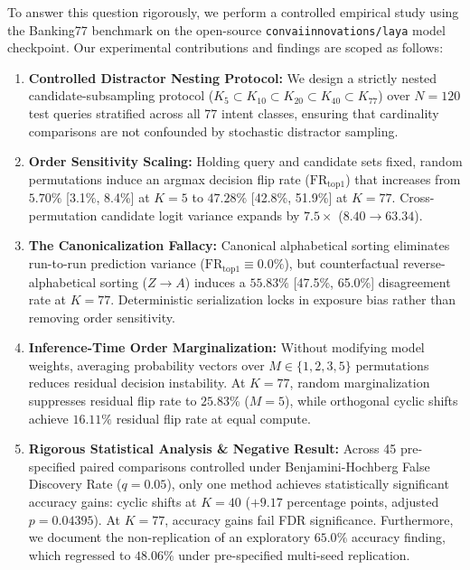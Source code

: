 \documentclass[11pt,a4paper]{article}
\begin{document}
To answer this question rigorously, we perform a controlled empirical study using the Banking77 benchmark \citep{casanueva2020efficient} on the open-source \texttt{convaiinnovations/laya} model checkpoint. Our experimental contributions and findings are scoped as follows:
\begin{enumerate}
    \item \textbf{Controlled Distractor Nesting Protocol:} We design a strictly nested candidate-subsampling protocol ($K_5 \subset K_{10} \subset K_{20} \subset K_{40} \subset K_{77}$) over $N=120$ test queries stratified across all 77 intent classes, ensuring that cardinality comparisons are not confounded by stochastic distractor sampling.
    \item \textbf{Order Sensitivity Scaling:} Holding query and candidate sets fixed, random permutations induce an argmax decision flip rate ($\mathrm{FR}_{\mathrm{top1}}$) that increases from $5.70\%$ [3.1\%, 8.4\%] at $K=5$ to $47.28\%$ [42.8\%, 51.9\%] at $K=77$. Cross-permutation candidate logit variance expands by $7.5\times$ ($8.40 \to 63.34$).
    \item \textbf{The Canonicalization Fallacy:} Canonical alphabetical sorting eliminates run-to-run prediction variance ($\mathrm{FR}_{\mathrm{top1}} \equiv 0.0\%$), but counterfactual reverse-alphabetical sorting ($Z \to A$) induces a $55.83\%$ [47.5\%, 65.0\%] disagreement rate at $K=77$. Deterministic serialization locks in exposure bias rather than removing order sensitivity.
    \item \textbf{Inference-Time Order Marginalization:} Without modifying model weights, averaging probability vectors over $M \in \{1, 2, 3, 5\}$ permutations reduces residual decision instability. At $K=77$, random marginalization suppresses residual flip rate to $25.83\%$ ($M=5$), while orthogonal cyclic shifts achieve $16.11\%$ residual flip rate at equal compute.
    \item \textbf{Rigorous Statistical Analysis \& Negative Result:} Across 45 pre-specified paired comparisons controlled under Benjamini-Hochberg False Discovery Rate ($q=0.05$), only one method achieves statistically significant accuracy gains: cyclic shifts at $K=40$ ($+9.17$ percentage points, adjusted $p=0.04395$). At $K=77$, accuracy gains fail FDR significance. Furthermore, we document the non-replication of an exploratory $65.0\%$ accuracy finding, which regressed to $48.06\%$ under pre-specified multi-seed replication.
\end{enumerate}
\end{document}
